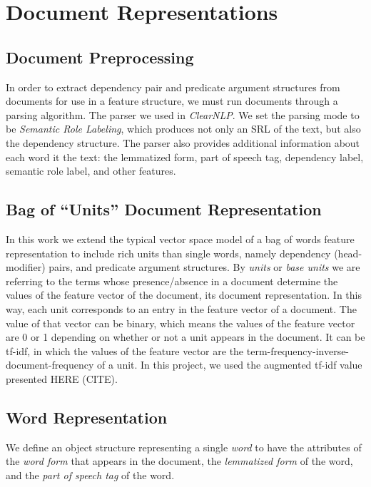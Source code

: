 \documentclass[11pt]{article}
\begin{document}
\section{Document Representations}


\subsection{Document Preprocessing}

In order to extract dependency pair and predicate argument structures from documents for use in a feature structure, we must run documents through a parsing algorithm. The parser we used in \emph{ClearNLP}. We set the parsing mode to be \emph{Semantic Role Labeling}, which produces not only an SRL of the text, but also the dependency structure. The parser also provides additional information about each word it the text: the lemmatized form, part of speech tag, dependency label, semantic role label, and other features. 

\subsection{Bag of ``Units'' Document Representation}

In this work we extend the typical vector space model of a bag of words feature representation to include rich units than single words, namely dependency (head-modifier) pairs, and predicate argument structures. By \emph{units} or \emph{base units} we are referring to the terms whose presence/absence in a document determine the values of the feature vector of the document, its document representation. In this way, each unit corresponds to an entry in the feature vector of a document. The value of that vector can be binary, which means the values of the feature vector are 0 or 1 depending on whether or not a unit appears in the document. It can be tf-idf, in which the values of the feature vector are the term-frequency-inverse-document-frequency of a unit. In this project, we used the augmented tf-idf value presented HERE (CITE).

\subsection{Word Representation}

We define an object structure representing a single \emph{word} to have the attributes of the \emph{word form} that appears in the document, the \emph{lemmatized form} of the word, and the \emph{part of speech tag} of the word. 
\end{document}
